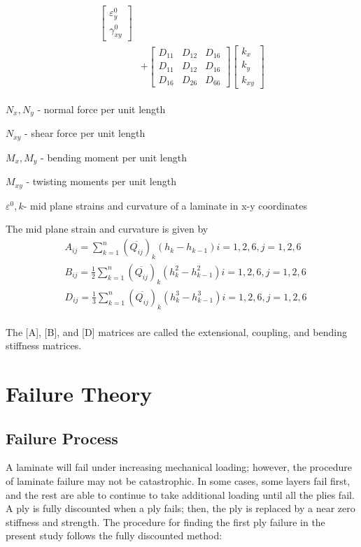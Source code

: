 \begin{equation}
\begin{array}{l}
\begin{aligned}
\begin{bmatrix}
        \varepsilon_y^0 \\
		\gamma_{xy}^0
    \end{bmatrix} \\ 
	&+  
	\begin{bmatrix}
		D_{11} & D_{12} & D_{16} \\
		D_{11} & D_{12} & D_{16} \\
		D_{16} & D_{26} & D_{66} 
	\end{bmatrix}
	\begin{bmatrix}
		k_x \\
		k_y \\
		k_{xy} 
	\end{bmatrix}
\end{aligned}
	\end{array}
\end{equation}


$N_x,N_y $  - normal force per unit length

$N_{xy} $  - shear force per unit length

$M_x, M_y $ - bending moment per unit length

$M_{xy} $  - twisting moments per unit length

$\varepsilon^{0}, k $- mid plane strains and curvature of a laminate in x-y coordinates

The mid plane strain and curvature is given by
\begin{equation}
    \begin{split}
    &A_{ij}=\sum_{k=1}^{n}(\overline{Q_{ij}})_k(h_k-h_{k-1})  i=1,2,6, j=1,2,6\\
    &B_{ij}=\frac{1}{2}\sum_{k=1}^{n}(\overline{Q_{ij}})_k(h^2_k - h_{k-1}^2)  i=1,2,6, j=1,2,6\\
    &D_{ij}=\frac{1}{3}\sum_{k=1}^{n}(\overline{Q_{ij}})_k(h^3_k - h_{k-1}^3) i=1,2,6, j=1,2,6\\
    \end{split}
\end{equation}

The [A], [B], and [D] matrices are called the extensional, coupling, and bending stiffness matrices.

\section{Failure Theory}

\subsection{Failure Process}
A laminate will fail under increasing mechanical loading; however, the procedure of laminate failure may not
be catastrophic.
 In some cases, some layers fail first, and the rest are able to continue to take additional loading
 until all the plies fail. A ply is fully discounted when a ply fails; then, the ply is replaced
by a near zero stiffness and strength. 
The procedure for finding the first ply failure in the present
study follows the fully discounted method:


